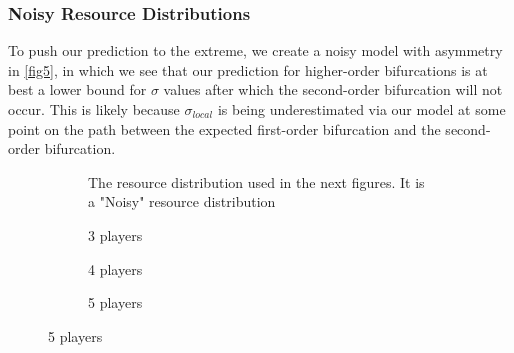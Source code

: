 \documentclass{article}
\begin{document}
            \subsubsection{Noisy Resource Distributions}
                To push our prediction to the extreme, we create a noisy model with asymmetry in \cref{fig5}, in which we see that our prediction for higher-order bifurcations is at best a lower bound for $\sigma$ values after which the second-order bifurcation will not occur.                This is likely because $\sigma_{local}$ is being underestimated via our model at some point on the path between the expected first-order bifurcation and the second-order bifurcation.
                \begin{figure}[ht!] 
                    \centering
                    \begin{subfigure}[b]{0.4\linewidth}
                        \centering
                        
                        \caption{The resource distribution used in the next figures. It is a "Noisy" resource distribution}
                        \label{fig5:a}
                    \end{subfigure}
                    \begin{subfigure}[b]{0.3\linewidth}
                        \centering
                         
                        \caption{3 players} 
                        \label{fig5:b} 
                        \vspace{4ex}
                    \end{subfigure}%
                    \begin{subfigure}[b]{0.3\linewidth}
                        \centering
                         
                        \caption{4 players} 
                        \label{fig5:c} 
                        \vspace{4ex}
                    \end{subfigure} 
                    \begin{subfigure}[b]{0.3\linewidth}
                        \centering
                         
                        \caption{5 players} 
                        \label{fig5:d}
                        \vspace{4ex}
                    \end{subfigure}%
                    

\end{figure}
\end{document}
